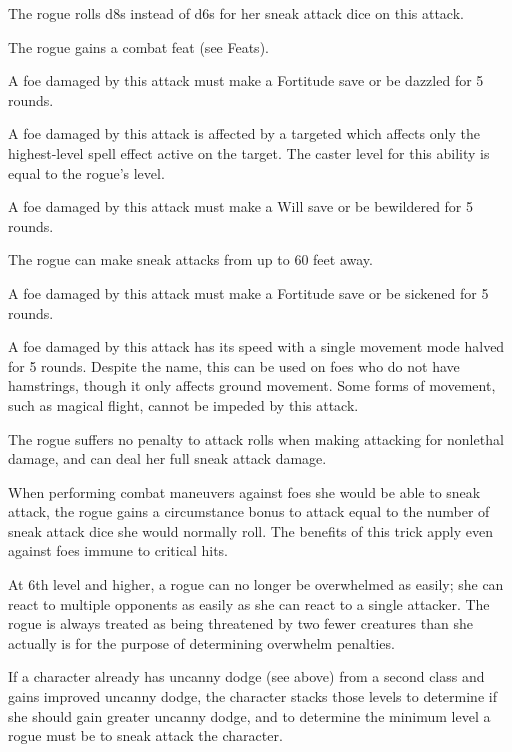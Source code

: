  The rogue rolls d8s instead of d6s for her sneak attack dice on this attack.

 The rogue gains a combat feat (see Feats).

 A foe damaged by this attack must make a Fortitude save or be dazzled for 5 rounds.

 A foe damaged by this attack is affected by a targeted  which affects only the highest-level spell effect active on the target. The caster level for this ability is equal to the rogue's level.

 A foe damaged by this attack must make a Will save or be bewildered for 5 rounds.

 The rogue can make sneak attacks from up to 60 feet away.

 A foe damaged by this attack must make a Fortitude save or be sickened for 5 rounds.

 A foe damaged by this attack has its speed with a single movement mode halved for 5 rounds. Despite the name, this can be used on foes who do not have hamstrings, though it only affects ground movement. Some forms of movement, such as magical flight, cannot be impeded by this attack.

 The rogue suffers no penalty to attack rolls when making attacking for nonlethal damage, and can deal her full sneak attack damage.

 When performing combat maneuvers against foes she would be able to sneak attack, the rogue gains a circumstance bonus to attack equal to the number of sneak attack dice she would normally roll. The benefits of this trick apply even against foes immune to critical hits.

 At 6th level and higher, a rogue can no longer be overwhelmed as easily; she can react to multiple opponents as easily as she can react to a single attacker. The rogue is always treated as being threatened by two fewer creatures than she actually is for the purpose of determining overwhelm penalties. 

\par If a character already has uncanny dodge (see above) from a second class and gains improved uncanny dodge, the character stacks those levels to determine if she should gain greater uncanny dodge, and to determine the minimum level a rogue must be to sneak attack the character.

